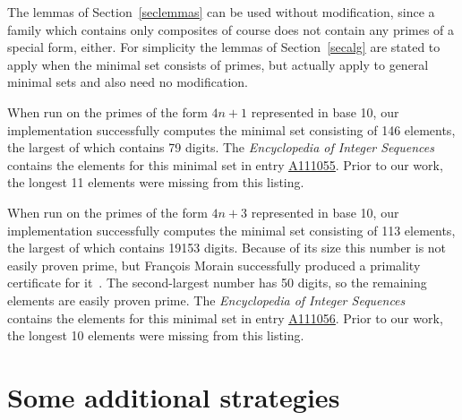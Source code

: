 \documentclass[12pt]{article}
\theoremstyle{plain}
\theoremstyle{definition}
\newcommand{\0}{\mathtt{0}}
\newcommand{\1}{\mathtt{1}}
\newcommand{\2}{\mathtt{2}}
\newcommand{\3}{\mathtt{3}}
\newcommand{\4}{\mathtt{4}}
\newcommand{\5}{\mathtt{5}}
\newcommand{\6}{\mathtt{6}}
\newcommand{\7}{\mathtt{7}}
\newcommand{\8}{\mathtt{8}}
\newcommand{\9}{\mathtt{9}}
\newcommand{\seqnum}[1]{\href{http://oeis.org/#1}{\underline{#1}}}
\newcommand{\updated}[1]{{\color{red}#1}}
\renewcommand{\updated}[1]{#1}
\begin{document}
The lemmas of Section~\ref{seclemmas} can be used without modification, since a family which contains only composites
of course does not contain any primes of a special form, either.  For simplicity the lemmas of Section~\ref{secalg} are stated
to apply when the minimal set consists of primes, but actually apply to general minimal sets and also need no modification.

When run on the primes of the form $4n+1$ represented in base 10, our implementation successfully computes the minimal set
consisting of 146 elements, the largest of which contains 79 digits.  The 
\textit{Encyclopedia of Integer Sequences}~\cite{oeis}
contains the elements for this minimal set in entry \seqnum{A111055}.  Prior to our work, the longest 11 elements were missing
from this listing.

When run on the primes of the form $4n+3$ represented in base 10, our implementation successfully computes the minimal set
consisting of 113 elements, the largest of which contains 19153 digits.  \updated{Because of its size
this number is not easily proven prime, but Fran\c{c}ois Morain successfully produced a primality certificate for it~\cite{mora}.}
The second-largest number has 50 digits, so the remaining elements
are easily proven prime.  The \textit{Encyclopedia of Integer Sequences}~\cite{oeis}
contains the elements for this minimal set in entry \seqnum{A111056}.  Prior to our work, the longest 10 elements were missing
from this listing.

\section{Some additional strategies}\label{addstrat}
\end{document}
